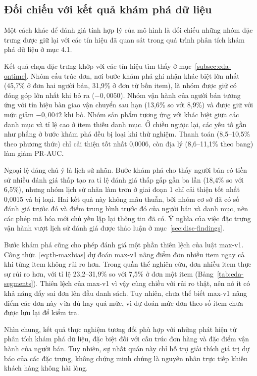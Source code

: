 \documentclass[12pt,a4paper]{report}
\begin{document}
\subsection{Đối chiếu với kết quả khám phá dữ liệu}\label{sec:analysis-eda}

Một cách khác để đánh giá tính hợp lý của mô hình là đối chiếu những nhóm đặc trưng được giữ lại với các tín hiệu đã quan sát trong quá trình phân tích khám phá dữ liệu ở mục 4.1.

Kết quả chọn đặc trưng khớp với các tín hiệu tìm thấy ở mục~\ref{subsec:eda-ontime}. Nhóm cấu trúc đơn, nơi bước khám phá ghi nhận khác biệt lớn nhất (45,7\% ở đơn hai người bán, 31,9\% ở đơn từ bốn item), là nhóm được giữ có đóng góp lớn nhất khi bỏ ra ($-0{,}0050$). Nhóm vận hành của người bán tương ứng với tín hiệu bàn giao vận chuyển sau hạn (13,6\% so với 8,9\%) và được giữ với mức giảm $-0{,}0042$ khi bỏ. Nhóm sản phẩm tương ứng với khác biệt giữa các danh mục và tỉ lệ cao ở item thiếu danh mục. Ở chiều ngược lại, các yếu tố gần như phẳng ở bước khám phá đều bị loại khi thử nghiệm. Thanh toán (8,5--10,5\% theo phương thức) chỉ cải thiện tốt nhất 0,0006, còn địa lý (8,6--11,1\% theo bang) làm giảm PR-AUC.

Ngoại lệ đáng chú ý là lịch sử nhãn. Bước khám phá cho thấy người bán có tiền sử nhiều đánh giá thấp tạo ra tỉ lệ đánh giá thấp gấp gần ba lần (18,4\% so với 6,5\%), nhưng nhóm lịch sử nhãn làm trơn ở giai đoạn 1 chỉ cải thiện tốt nhất 0,0015 và bị loại. Hai kết quả này không mâu thuẫn, bởi nhóm cơ sở đã có số đánh giá trước đó và điểm trung bình trước đó của người bán và danh mục, nên các phép mã hóa mới chủ yếu lặp lại thông tin đã có. Ý nghĩa của việc đặc trưng vận hành vượt lịch sử đánh giá được thảo luận ở mục~\ref{sec:disc-findings}.

Bước khám phá cũng cho phép đánh giá một phần thiên lệch của luật max-v1. Công thức~\eqref{eq:th-maxbias} dự đoán max-v1 nâng điểm đơn nhiều item ngay cả khi từng item không rủi ro hơn. Trong quần thể nghiên cứu, đơn nhiều item thực sự rủi ro hơn, với tỉ lệ 23,2--31,9\% so với 7,5\% ở đơn một item (Bảng~\ref{tab:eda-segments}). Thiên lệch của max-v1 vì vậy cùng chiều với rủi ro thật, nên nó ít có khả năng đẩy sai đơn lên đầu danh sách. Tuy nhiên, chưa thể biết max-v1 nâng điểm các đơn này vừa đủ hay quá mức, vì dự đoán mức đơn theo số item chưa được lưu lại để kiểm tra.

Nhìn chung, kết quả thực nghiệm tương đối phù hợp với những phát hiện từ phân tích khám phá dữ liệu, đặc biệt đối với cấu trúc đơn hàng và đặc điểm vận hành của người bán. Tuy nhiên, sự nhất quán này chỉ hỗ trợ giải thích giá trị dự báo của các đặc trưng, không chứng minh chúng là nguyên nhân trực tiếp khiến khách hàng không hài lòng.
\end{document}

